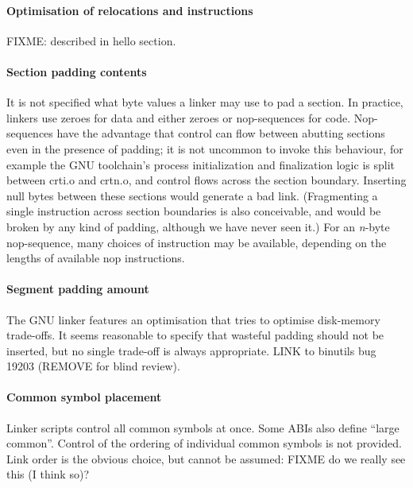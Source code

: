 \paragraph{Optimisation of relocations and instructions}
FIXME: described in hello section.

\paragraph{Section padding contents}
It is not specified what byte values a linker may use
to pad a section.
In practice, linkers use zeroes for data and either zeroes or nop-sequences for code.
Nop-sequences have the advantage that control can flow between abutting sections
even in the presence of padding; 
it is not uncommon to invoke this behaviour, 
for example 
the GNU toolchain's process initialization and finalization logic 
is split between \textsf{crti.o} and \textsf{crtn.o},
and control flows across the section boundary.
Inserting null bytes between these sections would generate a bad link.
(Fragmenting a single instruction across section boundaries
is also conceivable, and would be broken by any kind of padding, 
although we have never seen it.)
For an \textit{n}-byte nop-sequence, 
many choices of instruction may be available, 
depending on the lengths of available nop instructions.


\paragraph{Segment padding amount} 
The GNU linker features an optimisation
that tries to optimise disk-memory trade-offs.
It seems reasonable to specify that 
wasteful padding should not be inserted, but 
no single trade-off is always appropriate.
LINK to binutils bug 19203 (REMOVE for blind review).

\paragraph{Common symbol placement}
Linker scripts control all common symbols at once.
Some ABIs also define ``large common''.
Control of the ordering of individual common symbols
is not provided.
Link order is the obvious choice, but cannot be assumed: FIXME do we really see this (I think so)?

